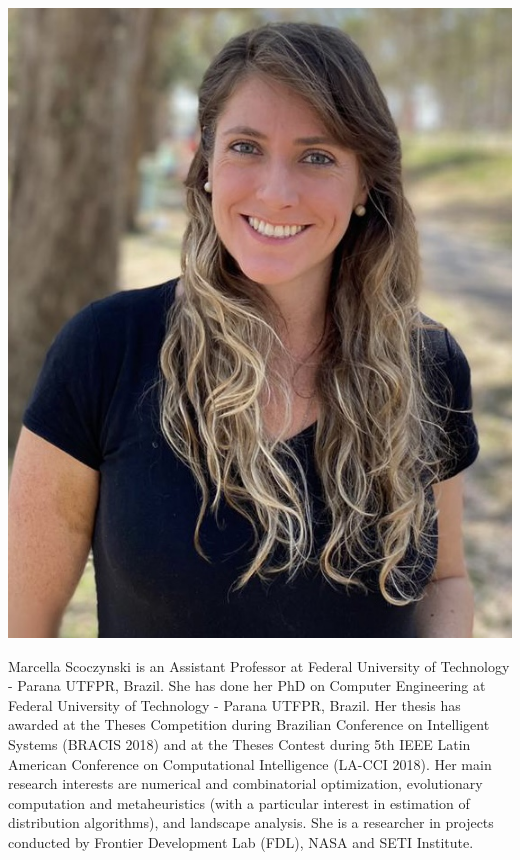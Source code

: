 \newpage
\vspace{2cm}
\begin{center}
\includegraphics[width=.3\textwidth]{Photos/mar2022.jpg}
\end{center}

Marcella Scoczynski is an Assistant Professor at Federal University of Technology - Parana UTFPR, Brazil. She has done her PhD on Computer Engineering at Federal University of Technology - Parana UTFPR, Brazil. Her thesis has awarded at the Theses Competition during Brazilian Conference on Intelligent Systems (BRACIS 2018) and at the Theses Contest during 5th IEEE Latin American Conference on Computational Intelligence (LA-CCI 2018). Her main research interests are numerical and combinatorial optimization, evolutionary computation and metaheuristics (with a particular interest in estimation of distribution algorithms), and landscape analysis. She is a researcher in projects conducted by Frontier Development Lab (FDL), NASA and SETI Institute. 



